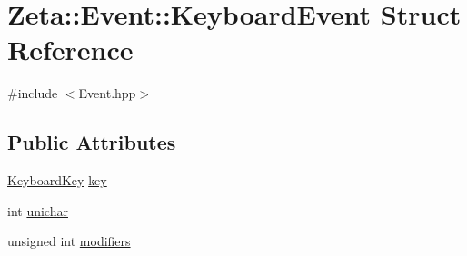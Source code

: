 \hypertarget{structZeta_1_1Event_1_1KeyboardEvent}{\section{Zeta\+:\+:Event\+:\+:Keyboard\+Event Struct Reference}
\label{structZeta_1_1Event_1_1KeyboardEvent}
}


{\ttfamily \#include $<$Event.\+hpp$>$}

\subsection*{Public Attributes}
\begin{DoxyCompactItemize}
\item 
\hyperlink{namespaceZeta_ad9d19d996b624b55871338b8ca7e629e}{Keyboard\+Key} \hyperlink{structZeta_1_1Event_1_1KeyboardEvent_a0403d05eef48b6c3f9fd289437559494}{key}
\item 
int \hyperlink{structZeta_1_1Event_1_1KeyboardEvent_aa85199cbe831fb21614471006bf0cb8f}{unichar}
\item 
unsigned int \hyperlink{structZeta_1_1Event_1_1KeyboardEvent_a72c26e4419dc2819ac5a149a23e5bb93}{modifiers}
\end{DoxyCompactItemize}


